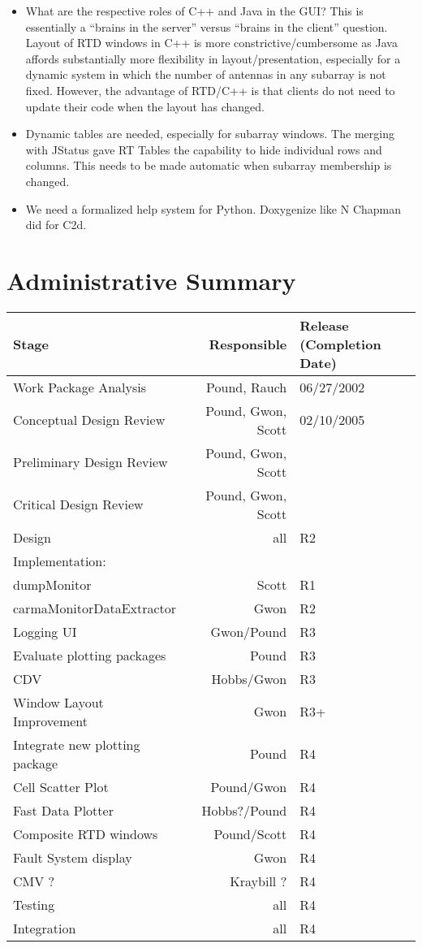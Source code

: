 \documentclass[preprint]{aastex}
\begin{document}
\begin{itemize}
\item What are the respective roles of C++ and Java in the GUI?  This is
essentially a ``brains in the server'' versus ``brains in the client''
question.  Layout of RTD windows in C++ is more constrictive/cumbersome
as Java affords substantially more flexibility in layout/presentation,
especially for a dynamic system in which the number of antennas in any
subarray is not fixed.  However, the advantage of RTD/C++ is that clients
do not need to update their code when the layout has changed.

\item Dynamic tables are needed, especially for subarray windows.
The merging with JStatus gave RT Tables the capability to hide
individual rows and columns. This needs to be made automatic
when subarray membership is changed.

\item We need a formalized help system for Python. Doxygenize
like N Chapman did for C2d.
\end{itemize}


\section{Administrative Summary}

\begin{tabular}{lrl}
\hline
Stage & Responsible & Release (Completion Date) \\
\hline
Work Package Analysis     & Pound, Rauch& 06/27/2002\\
Conceptual Design Review  & Pound, Gwon, Scott& 02/10/2005 \\
Preliminary Design Review & Pound, Gwon, Scott& \\
Critical Design Review    & Pound, Gwon, Scott& \\
\hline
Design  & all & R2 \\
Implementation: &&\\
dumpMonitor & Scott & R1\\
carmaMonitorDataExtractor & Gwon & R2 \\
Logging UI & Gwon/Pound  & R3 \\
Evaluate plotting packages& Pound & R3 \\
CDV & Hobbs/Gwon & R3 \\
Window Layout Improvement & Gwon & R3+ \\
Integrate new plotting package & Pound & R4 \\
Cell Scatter Plot & Pound/Gwon & R4 \\
Fast Data Plotter & Hobbs?/Pound & R4 \\
Composite RTD windows & Pound/Scott & R4 \\
Fault System display & Gwon & R4 \\
CMV ? & Kraybill ? & R4 \\
Testing & all & R4 \\
Integration & all & R4 \\
\hline
\end{tabular}
\end{document}
